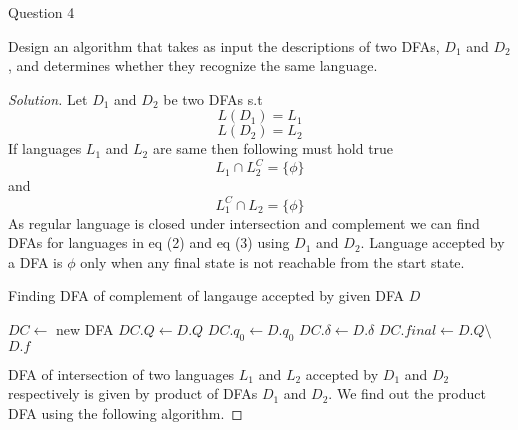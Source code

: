 \begin{solution}{Question 4}\label{ques:4}
    \begin{question}
    Design an algorithm that takes as input the descriptions of two DFAs, $D_1$ and $D_2$, and
    determines whether they recognize the same language.
    \end{question}
    \tcblower{}
    \begin{proof}[Solution]
        Let $D_1$ and $D_2$ be two DFAs s.t 
        \[L(D_1) = L_1 \]
        \[L(D_2) = L_2 \]
        If languages $L_1$ and $L_2$ are same then following must hold true
        \begin{equation}
            L_1 \cap L_2^C = \{\phi\}
        \end{equation}
        and
        \begin{equation}
            L_1^C \cap L_2 = \{\phi\}
        \end{equation}
        As regular language is closed under intersection and complement we can find DFAs for languages in eq (2) and eq (3) using $D_1$ and $D_2$. Language accepted by a DFA is ${\phi}$ only when any final state is not reachable from the start state.
        
        
        \begin{algorithm}[H]
            \caption{Finding DFA of complement of langauge accepted by given DFA $D$}
            \begin{algorithmic}[1]
                    \State $DC \gets$ new DFA
                    \State $DC.Q \gets D.Q$
                    \State $DC.q_0 \gets D.q_0$
                    \State $DC.\delta \gets D.\delta$
                    \State $DC.final \gets D.Q \setminus$ $D.f$
                \EndProcedure{}
            \end{algorithmic}
        \end{algorithm}
        
        DFA of intersection of two languages $L_1$ and $L_2$ accepted by $D_1$ and $D_2$ respectively is given by product of DFAs $D_1$ and $D_2$. We find out the product DFA using the following algorithm.
        

\end{proof}
\end{solution}
